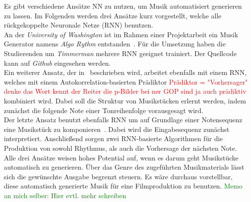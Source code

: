 \documentclass[times, 11pt,twocolumn]{article}
\begin{document}
 \label{sec:SOTAProduktion}
Es gibt verschiedene Ansätze NN zu nutzen, um Musik automatisiert generieren zu lassen. Im Folgenden werden drei Ansätze kurz vorgestellt, welche alle rückgekoppelte Neuronale Netze (RNN) benutzen. \\
An der \textit{University of Washington} ist im Rahmen einer Projektarbeit ein Musik Generator namens \textit{Algo Rythm} entstanden~\cite{Algorithm}. Für die Umsetzung haben die Studierenden um \textit{Timmerman} mehrere RNN geeignet trainiert. Der Quellcode kann auf \textit{Github} \cite{AlgorithmGit} eingesehen werden.\\
Ein weiterer Ansatz, der in~\cite{eck+lapalme:2008} beschrieben wird, arbeitet ebenfalls mit einem RNN, welches mit einem Autokorrelation-basierten Prädiktor \textcolor{red}{Prädiktor = "Vorhersager" denke das Wort kennt der Reiter die p-Bilder bei ner GOP sind ja auch prädiktiv} kombiniert wird. Dabei soll die Struktur von Musikstücken erlernt werden, indem zunächst die folgende Note einer Tonreihenfolge vorausgesagt wird. \\
Der letzte Ansatz benutzt ebenfalls RNN um auf Grundlage einer Notensequenz eine Musikstück zu komponieren~\cite{browne2001system}. Dabei wird die Eingabesequenz zunächst interpretiert. Anschließend sorgen zwei RNN-basierte Algorithmen für die Produktion von sowohl Rhythmus, als auch die Vorhersage der nächsten Note. \\

Alle drei Ansätze weisen hohes Potential auf, wenn es darum geht Musikstücke automatisch zu generieren. Über das Genre des zugeführten Musikmaterials lässt sich die gewünschte Ausgabe begrenzt steuern. Es wäre durchaus vorstellbar, diese automatisch generierte Musik für eine Filmproduktion zu benutzen.
\textcolor{green}{Memo an mich selber: Hier evtl. mehr schreiben}
\end{document}
